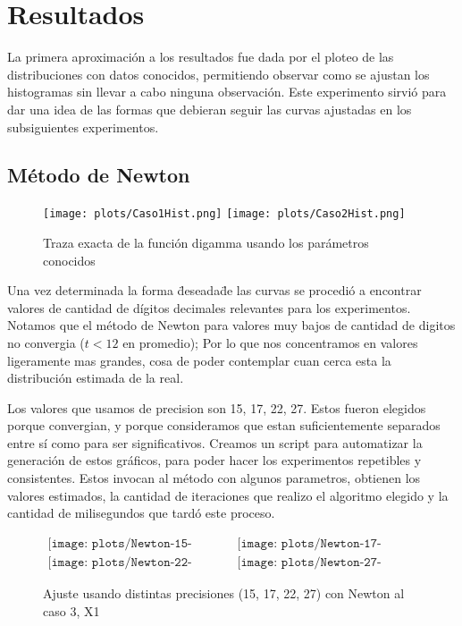 \section{Resultados}


La primera aproximaci\'on a los resultados fue dada por el ploteo de las distribuciones con datos conocidos, permitiendo observar como se ajustan los histogramas sin llevar a cabo ninguna observaci\'on. Este experimento sirvi\'o para dar una idea de las formas que debieran seguir las curvas ajustadas en los subsiguientes experimentos.

\subsection{M\'etodo de Newton}

\begin{figure} [H]
\begin {center}
\texttt{[image: plots/Caso1Hist.png]}
\texttt{[image: plots/Caso2Hist.png]}
\end {center}
\caption{Traza exacta de la funci\'on digamma usando los par\'ametros conocidos}
\label{fig:FitCaso3Newton}
\end{figure}

Una vez determinada la forma \"deseada\" de las curvas se procedi\'o a encontrar valores de cantidad de d\'igitos decimales relevantes para los experimentos. Notamos que el m\'etodo de Newton para valores muy bajos de cantidad de digitos no convergia ($t < 12$ en promedio); Por lo que nos concentramos en valores
ligeramente mas grandes, cosa de poder contemplar cuan cerca esta la distribuci\'on estimada de la real.

Los valores que usamos de precision son 15, 17, 22, 27. Estos fueron elegidos porque convergian, y porque consideramos que estan
suficientemente separados entre s\'i como para ser significativos. Creamos un script para automatizar la generaci\'on de estos gr\'aficos,
para poder hacer los experimentos repetibles y consistentes. Estos invocan al m\'etodo con algunos parametros, obtienen los
valores estimados, la cantidad de iteraciones que realizo el algoritmo elegido y la cantidad de milisegundos que tard\'o este proceso.


\begin{figure} [H]
$\begin{array}{cc}
\texttt{[image: plots/Newton-15-caso3.png]} &
\texttt{[image: plots/Newton-17-caso3.png]} \\
\texttt{[image: plots/Newton-22-caso3.png]} &
\texttt{[image: plots/Newton-27-caso3.png]}
\end{array}$
\caption{Ajuste usando distintas precisiones (15, 17, 22, 27) con Newton al caso 3, X1}
\label{fig:FitCaso3Newton}
\end{figure}

